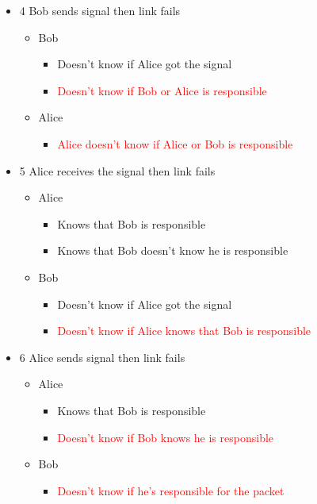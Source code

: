 \begin{itemize}
    \item 4 Bob sends signal then link fails
    \begin{itemize}
        \item Bob
        \begin{itemize}
            \item {Doesn’t know if Alice got the signal}
            \item \textcolor{red}{Doesn’t know if Bob or Alice is responsible}
        \end{itemize}
        \item Alice
        \begin{itemize}
            \item \textcolor{red}{Alice doesn’t know if Alice or Bob is responsible}
        \end{itemize}
    \end{itemize}

    \item 5 Alice receives the signal then link fails
    \begin{itemize}
        \item Alice
        \begin{itemize}
            \item Knows that Bob is responsible
            \item Knows that Bob doesn’t know he is responsible
        \end{itemize}
        \item Bob
        \begin{itemize}
            \item Doesn’t know if Alice got the signal
            \item \textcolor{red}{Doesn’t know if Alice knows that Bob is responsible}
        \end{itemize}
    \end{itemize}

    \item 6 Alice sends signal then link fails
    \begin{itemize}
        \item Alice
        \begin{itemize}
            \item Knows that Bob is responsible
            \item \textcolor{red}{Doesn’t know if Bob knows he is responsible}
        \end{itemize}
        \item Bob
        \begin{itemize}
            \item \textcolor{red}{Doesn’t know if he’s responsible for the packet}
        \end{itemize}
    \end{itemize}


\end{itemize}
